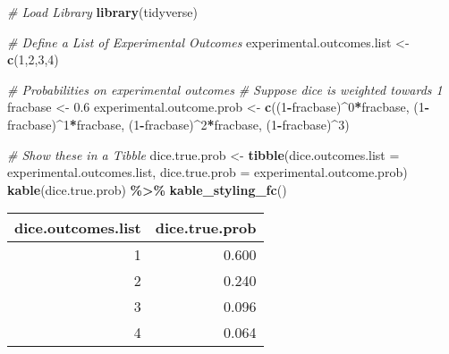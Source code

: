 \documentclass[
]{book}
\newenvironment{Shaded}{\begin{snugshade}}{\end{snugshade}}
\newcommand{\CommentTok}[1]{\textcolor[rgb]{0.56,0.35,0.01}{\textit{#1}}}
\newcommand{\DataTypeTok}[1]{\textcolor[rgb]{0.13,0.29,0.53}{#1}}
\newcommand{\DecValTok}[1]{\textcolor[rgb]{0.00,0.00,0.81}{#1}}
\newcommand{\FloatTok}[1]{\textcolor[rgb]{0.00,0.00,0.81}{#1}}
\newcommand{\KeywordTok}[1]{\textcolor[rgb]{0.13,0.29,0.53}{\textbf{#1}}}
\newcommand{\NormalTok}[1]{#1}
\newcommand{\OperatorTok}[1]{\textcolor[rgb]{0.81,0.36,0.00}{\textbf{#1}}}
\newcommand{\StringTok}[1]{\textcolor[rgb]{0.31,0.60,0.02}{#1}}
\begin{document}
\begin{Shaded}
\begin{Highlighting}[]
\CommentTok{\# Load Library}
\KeywordTok{library}\NormalTok{(tidyverse)}

\CommentTok{\# Define a List of Experimental Outcomes}
\NormalTok{experimental.outcomes.list \textless{}{-}}\StringTok{ }\KeywordTok{c}\NormalTok{(}\DecValTok{1}\NormalTok{,}\DecValTok{2}\NormalTok{,}\DecValTok{3}\NormalTok{,}\DecValTok{4}\NormalTok{)}

\CommentTok{\# Probabilities on experimental outcomes}
\CommentTok{\# Suppose dice is weighted towards 1}
\NormalTok{fracbase \textless{}{-}}\StringTok{ }\FloatTok{0.6}
\NormalTok{experimental.outcome.prob \textless{}{-}}\StringTok{ }\KeywordTok{c}\NormalTok{((}\DecValTok{1}\OperatorTok{{-}}\NormalTok{fracbase)}\OperatorTok{\^{}}\DecValTok{0}\OperatorTok{*}\NormalTok{fracbase,}
\NormalTok{                               (}\DecValTok{1}\OperatorTok{{-}}\NormalTok{fracbase)}\OperatorTok{\^{}}\DecValTok{1}\OperatorTok{*}\NormalTok{fracbase,}
\NormalTok{                               (}\DecValTok{1}\OperatorTok{{-}}\NormalTok{fracbase)}\OperatorTok{\^{}}\DecValTok{2}\OperatorTok{*}\NormalTok{fracbase,}
\NormalTok{                               (}\DecValTok{1}\OperatorTok{{-}}\NormalTok{fracbase)}\OperatorTok{\^{}}\DecValTok{3}\NormalTok{)}

\CommentTok{\# Show these in a Tibble}
\NormalTok{dice.true.prob \textless{}{-}}\StringTok{ }\KeywordTok{tibble}\NormalTok{(}\DataTypeTok{dice.outcomes.list =}\NormalTok{ experimental.outcomes.list,}
                         \DataTypeTok{dice.true.prob =}\NormalTok{ experimental.outcome.prob)}
\KeywordTok{kable}\NormalTok{(dice.true.prob) }\OperatorTok{\%\textgreater{}\%}\StringTok{ }\KeywordTok{kable\_styling\_fc}\NormalTok{()}
\end{Highlighting}
\end{Shaded}

\begin{table}[!h]
\centering
\begin{tabular}{r|r}
\hline
dice.outcomes.list & dice.true.prob\\
\hline
\rowcolor{gray!6}  1 & 0.600\\
\hline
2 & 0.240\\
\hline
\rowcolor{gray!6}  3 & 0.096\\
\hline
4 & 0.064\\
\hline
\end{tabular}
\end{table}
\end{document}
